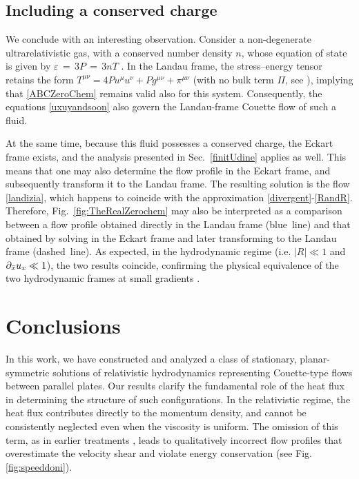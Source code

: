 \documentclass[a4paper, amsfonts, amssymb, amsmath, reprint, showkeys, nofootinbib, twoside,notitlepage,onecolumn]{revtex4-1}
\theoremstyle{definition}
\theoremstyle{theorem}
\begin{document}
\vspace{-0.3cm}
\subsection{Including a conserved charge}\label{lastissimo}
\vspace{-0.2cm}

We conclude with an interesting observation. Consider a non-degenerate ultrarelativistic gas, with a conserved number density $n$, whose equation of state is given by $\varepsilon\,{=}\,3P\,{=}\,3nT$ \cite[\S 2.4.4]{rezzolla_book}. In the Landau frame, the stress–energy tensor retains the form $T^{\mu \nu}=4Pu^\mu u^\nu +Pg^{\mu \nu}+\pi^{\mu \nu}$ (with no bulk term $\Pi$, see \cite{Weinberg1971,BulkGavassino}), implying that \eqref{ABCZeroChem} remains valid also for this system. Consequently, the equations \eqref{uxuyandsoon} also govern the Landau-frame Couette flow of such a fluid.

At the same time, because this fluid possesses a conserved charge, the Eckart frame exists, and the analysis presented in Sec.~\ref{finitUdine} applies as well. This means that one may also determine the flow profile in the Eckart frame, and subsequently transform it to the Landau frame. The resulting solution is the flow \eqref{landizia}, which happens to coincide with the approximation \eqref{divergent}-\eqref{RandR}.
Therefore, Fig.~\ref{fig:TheRealZerochem} may also be interpreted as a comparison between a flow profile obtained directly in the Landau frame (blue~line) and that obtained by solving in the Eckart frame and later transforming to the Landau frame (dashed~line). As expected, in the hydrodynamic regime (i.e. $|R|\ll 1$ and $\partial_{\Bar{x}}u_x \ll 1$), the two results coincide, confirming the physical equivalence of the two hydrodynamic frames at small gradients \cite{Israel_Stewart_1979,Kovtun2019,GavassinoNonHydro2022,GavassinoUniveraalityI2023odx}.


\section{Conclusions}

In this work, we have constructed and analyzed a class of stationary, planar-symmetric solutions of relativistic hydrodynamics representing Couette-type flows between parallel plates. Our results clarify the fundamental role of the heat flux in determining the structure of such configurations. In the relativistic regime, the heat flux contributes directly to the momentum density, and cannot be consistently neglected even when the viscosity is uniform. The omission of this term, as in earlier treatments \cite{Rogava1996}, leads to qualitatively incorrect flow profiles that overestimate the velocity shear and violate energy conservation (see Fig. \ref{fig:speeddoni}).
\end{document}
